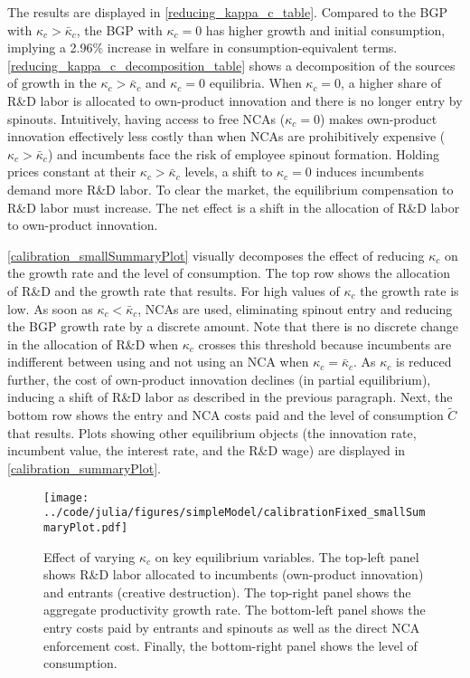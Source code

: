 \documentclass[11pt,english]{article}
\theoremstyle{definition}
\begin{document}
The results are displayed in \autoref{reducing_kappa_c_table}. Compared to the BGP with $\kappa_c > \bar{\kappa}_c$, the BGP with $\kappa_c = 0$ has higher growth and initial consumption, implying a 2.96\% increase in welfare in consumption-equivalent terms. \autoref{reducing_kappa_c_decomposition_table} shows a decomposition of the sources of growth in the $\kappa_c > \bar{\kappa}_c$ and $\kappa_c = 0$ equilibria. When $\kappa_c = 0$, a higher share of R\&D labor is allocated to own-product innovation and there is no longer entry by spinouts. Intuitively, having access to free NCAs ($\kappa_c = 0$) makes own-product innovation effectively less costly than when NCAs are prohibitively expensive ($\kappa_c > \bar{\kappa}_c$) and incumbents face the risk of employee spinout formation. Holding prices constant at their $\kappa_c > \bar{\kappa}_c$ levels, a shift to $\kappa_c = 0$ induces incumbents demand more R\&D labor. To clear the market, the equilibrium compensation to R\&D labor must increase. The net effect is a shift in the allocation of R\&D labor to own-product innovation.

\autoref{calibration_smallSummaryPlot} visually decomposes the effect of reducing $\kappa_c$ on the growth rate and the level of consumption. The top row shows the allocation of R\&D and the growth rate that results. For high values of $\kappa_c$ the growth rate is low. As soon as $\kappa_c < \bar{\kappa}_c$, NCAs are used, eliminating spinout entry and reducing the BGP growth rate by a discrete amount. Note that there is no discrete change in the allocation of R\&D when $\kappa_c$ crosses this threshold because incumbents are indifferent between using and not using an NCA when $\kappa_c = \bar{\kappa}_c$. As $\kappa_c$ is reduced further, the cost of own-product innovation declines (in partial equilibrium), inducing a shift of R\&D labor as described in the previous paragraph. Next, the bottom row shows the entry and NCA costs paid and the level of consumption $\tilde{C}$ that results. Plots showing other equilibrium objects (the innovation rate, incumbent value, the interest rate, and the R\&D wage) are displayed in \autoref{calibration_summaryPlot}.

\begin{figure}[]
	\centering
	\texttt{[image: ../code/julia/figures/simpleModel/calibrationFixed\_smallSummaryPlot.pdf]}
	\caption{Effect of varying $\kappa_c$ on key equilibrium variables. The top-left panel shows R\&D labor allocated to incumbents (own-product innovation) and entrants (creative destruction). The top-right panel shows the aggregate productivity growth rate. The bottom-left panel shows the entry costs paid by entrants and spinouts as well as the direct NCA enforcement cost. Finally, the bottom-right panel shows the level of consumption.}
	\label{calibration_smallSummaryPlot}
\end{figure}
\end{document}
